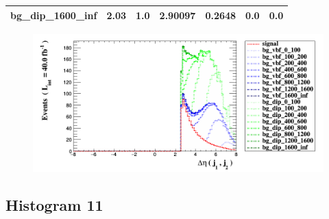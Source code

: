 \documentclass[a4paper, 10pt]{article}
\begin{document}
\begin{table}[H]
\begin{center}
\begin{tabular}{|m{23.0mm}|m{23.0mm}|m{18.0mm}|m{19.0mm}|m{19.0mm}|m{19.0mm}|m{19.0mm}|}
      \hline
      {\cellcolor{white}         bg\_dip\_1600\_inf}& {\cellcolor{white}         2.03}& {\cellcolor{white}         1.0}& {\cellcolor{white}         2.90097}& {\cellcolor{white}         0.2648}& {\cellcolor{green}         0.0}& {\cellcolor{green}         0.0}\\
\hline
    \end{tabular}
  \end{center}
\end{table}

\begin{figure}[H]
  \begin{center}
    \includegraphics[scale=0.45]{selection_9.png}\\
\caption{   }
  \end{center}
\end{figure}
      \newpage
\subsection{ Histogram 11}
\end{document}
